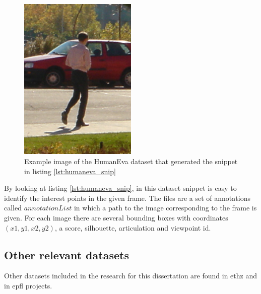 \begin{figure}[htp]
	
	\centering
	\includegraphics[width=0.5\textwidth]{capstate/imgs/00050.png}
	
	\caption{Example image of the HumanEva dataset that generated the snippet in listing \ref{lst:humaneva_snip} }
	\label{fig:00050}
	
\end{figure}

By looking at listing \ref{lst:humaneva_snip}, in this dataset snippet is easy to identify the interest points in the given frame. The files are a set of annotations called $annotationList$ in which a path to the image corresponding to the frame is given. For each image there are several bounding boxes with coordinates $(x1,y1,x2,y2)$, a score, silhouette, articulation and viewpoint id.

\subsection{Other relevant datasets}
Other datasets included in the research for this dissertation are found in \gls{ethz} and in \gls{epfl} projects. 
